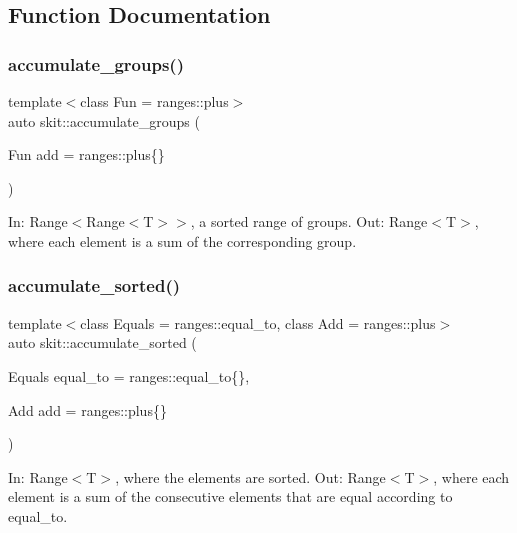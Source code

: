 \subsection{Function Documentation}
\mbox{\label{namespaceskit_a9c5865c7949c108631955466c92bf042}} 
\subsubsection{\texorpdfstring{accumulate\+\_\+groups()}{accumulate\_groups()}}
{\footnotesize\ttfamily template$<$class Fun  = ranges\+::plus$>$ \\
auto skit\+::accumulate\+\_\+groups (\begin{DoxyParamCaption}\item[{Fun}]{add = {\ttfamily ranges\+:\+:plus\{\}} }\end{DoxyParamCaption})}

In\+: Range$<$Range$<$\+T$>$$>$, a sorted range of groups. Out\+: Range$<$\+T$>$, where each element is a sum of the corresponding group. \mbox{\label{namespaceskit_af5e774baebeeafedfe9ead9cbab087f5}} 
\subsubsection{\texorpdfstring{accumulate\+\_\+sorted()}{accumulate\_sorted()}}
{\footnotesize\ttfamily template$<$class Equals  = ranges\+::equal\+\_\+to, class Add  = ranges\+::plus$>$ \\
auto skit\+::accumulate\+\_\+sorted (\begin{DoxyParamCaption}\item[{Equals}]{equal\+\_\+to = {\ttfamily ranges\+:\+:equal\+\_\+to\{\}},  }\item[{Add}]{add = {\ttfamily ranges\+:\+:plus\{\}} }\end{DoxyParamCaption})}

In\+: Range$<$\+T$>$, where the elements are sorted. Out\+: Range$<$\+T$>$, where each element is a sum of the consecutive elements that are equal according to {\ttfamily equal\+\_\+to}. \mbox{\label{namespaceskit_a5ef8c0239941e3274b7d2ca79bf0ac0d}} 
